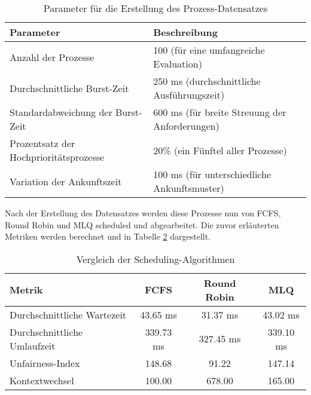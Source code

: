 \begin{table}[htbp]
	\centering
	\begin{tabular}{ll}
		\toprule
		Parameter & Beschreibung \\
		\midrule
		Anzahl der Prozesse & 100 (für eine umfangreiche Evaluation) \\
		Durchschnittliche Burst-Zeit & 250 ms (durchschnittliche Ausführungszeit) \\
		Standardabweichung der Burst-Zeit & 600 ms (für breite Streuung der Anforderungen) \\
		Prozentsatz der Hochprioritätsprozesse & 20\% (ein Fünftel aller Prozesse) \\
		Variation der Ankunftszeit & 100 ms (für unterschiedliche Ankunftsmuster) \\
		\bottomrule
	\end{tabular}
		\caption{Parameter für die Erstellung des Prozess-Datensatzes}
	\label{tab:process_dataset_parameters}
\end{table}

Nach der Erstellung des Datensatzes werden diese Prozesse nun von \ac{FCFS}, Round Robin und \ac{MLQ} scheduled und abgearbeitet. Die zuvor erläuterten Metriken werden berechnet und in Tabelle \ref{tab:scheduling_comparison} dargestellt. 

\begin{table}[htbp]
	\centering
	\begin{tabular}{lccc}
		\toprule
		Metrik & FCFS & Round Robin & MLQ \\
		\midrule
		Durchschnittliche Wartezeit & 43.65 ms & 31.37 ms & 43.02 ms \\
		Durchschnittliche Umlaufzeit & 339.73 ms & 327.45 ms & 339.10 ms \\
		Unfairness-Index & 148.68  & 91.22  & 147.14  \\
		Kontextwechsel & 100.00  & 678.00  & 165.00  \\
		\bottomrule
	\end{tabular}
	\caption{Vergleich der Scheduling-Algorithmen}
	\label{tab:scheduling_comparison}
\end{table}

